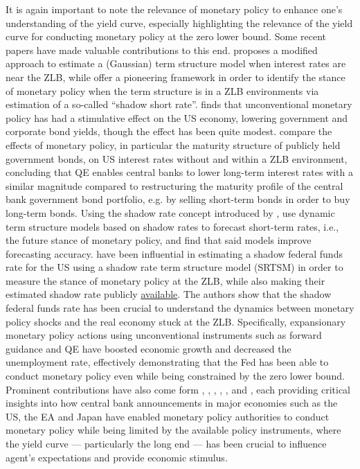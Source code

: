 It is again important to note the relevance of monetary policy to enhance one's understanding of the yield curve, especially highlighting the relevance of the yield curve for conducting monetary policy at the zero lower bound. 
Some recent papers have made valuable contributions to this end. 
\citet{Krippner_2012} proposes a modified approach to estimate a (Gaussian) term structure model when interest rates are near the ZLB, while \citet{KRIPPNER2013135} offer a pioneering framework in order to identify the stance of monetary policy when the term structure is in a ZLB environments via estimation of a so-called ``shadow short rate''.
\citet{Wright_2012} finds that unconventional monetary policy has had a stimulative effect on the US economy, lowering government and corporate bond yields, though the effect has been quite modest. 
\citet{Hamilton_Wu_2012} compare the effects of monetary policy, in particular the maturity structure of publicly held government bonds, on US interest rates without and within a ZLB environment, concluding that QE enables central banks to lower long-term interest rates with a similar magnitude compared to restructuring the maturity profile of the central bank government bond portfolio, e.g. by selling short-term bonds in order to buy long-term bonds.
Using the shadow rate concept introduced by \citet{KRIPPNER2013135}, \citet{Bauer_Rudebusch_2016} use dynamic term structure models based on shadow rates to forecast short-term rates, i.e., the future stance of monetary policy, and find that said models improve forecasting accuracy.
\citet{Wu_Xia_2016} have been influential in estimating a shadow federal funds rate for the US using a shadow rate term structure model (SRTSM) in order to measure the stance of monetary policy at the ZLB, while also making their estimated shadow rate publicly \href{https://www.atlantafed.org/cqer/research/wu-xia-shadow-federal-funds-rate}{available}. 
The authors show that the shadow federal funds rate has been crucial to understand the dynamics between monetary policy shocks and the real economy stuck at the ZLB. Specifically, expansionary monetary policy actions using unconventional instruments such as forward guidance and QE have boosted economic growth and decreased the unemployment rate, effectively demonstrating that the Fed has been able to conduct monetary policy even while being constrained by the zero lower bound. 
%
Prominent contributions have also come form \citet{gurkaynak2005actions}, \citet{Nakamura_2018}, \citet{ALTAVILLA2019162}, \citet{jarocinski2020deconstructing}, \citet{SWANSON202132}, \citet{bauer_swanson_2023} and \citet{NAKAMURA2024101300}, each providing critical insights into how central bank announcements in major economies such as the US, the EA and Japan have enabled monetary policy authorities to conduct monetary policy while being limited by the available policy instruments, where the yield curve --- particularly the long end --- has been crucial to influence agent's expectations and provide economic stimulus. 

